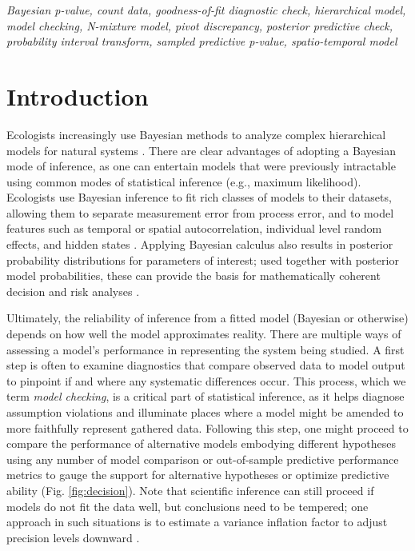 \documentclass[12pt,english]{article}
\begin{document}
\begin{spacing}{1.9}
{\em Bayesian p-value, count data, goodness-of-fit diagnostic check,
  hierarchical model, model checking, N-mixture model, pivot
  discrepancy, posterior predictive check, probability interval
  transform, sampled predictive p-value, spatio-temporal model}



\def\VAR{{\rm Var}\,} \def\COV{{\rm Cov}\,} \def\Prob{{\rm P}\,}
\def\bfx{{\bf x}} \def\bfX{{\bf X}} \def\bfY{{\bf Y}\,} \def\bfy{{\bf
    y}} \def\bfZ{{\bf Z}\,} \def\bftheta{\boldsymbol{\theta}}
\def\bfeta{\boldsymbol{\eta}} \def\bfOmega{\boldsymbol{\Omega}}
\def\bfbeta{\boldsymbol{\beta}} \def\bfSigma{\boldsymbol{\Sigma}}
\def\bfmu{\boldsymbol{\mu}} \def\bfnu{\boldsymbol{\nu}}
\def\bfepsilon{\boldsymbol{\epsilon}} \def\R2{\rm I\!R^2}


\section{Introduction}

Ecologists increasingly use Bayesian methods to analyze complex
hierarchical models for natural systems \citep{HobbsHooten2015}.
There are clear advantages of adopting a Bayesian mode of inference,
as one can entertain models that were previously intractable using
common modes of statistical inference (e.g., maximum
likelihood). Ecologists use Bayesian inference to fit rich classes of
models to their datasets, allowing them to separate measurement error
from process error, and to model features such as temporal or spatial
autocorrelation, individual level random effects, and hidden states
\citep{LinkEtAl2002,ClarkBjornstad2004,CressieEtAl2009}. Applying
Bayesian calculus also results in posterior probability distributions
for parameters of interest; used together with posterior model
probabilities, these can provide the basis for mathematically coherent
decision and risk analyses \citep{LinkBarker2006,Berger2013,
  williams2016combining}.

Ultimately, the reliability of inference from a fitted model (Bayesian
or otherwise) depends on how well the model approximates reality.
There are multiple ways of assessing a model's performance in
representing the system being studied. A first step is often to
examine diagnostics that compare observed data to model output to
pinpoint if and where any systematic differences occur. This process,
which we term \textit{model checking}, is a critical part of
statistical inference, as it helps diagnose assumption violations and
illuminate places where a model might be amended to more faithfully
represent gathered data. Following this step, one might proceed to
compare the performance of alternative models embodying different
hypotheses using any number of model comparison or out-of-sample
predictive performance metrics \citep[see][for a
review]{HootenHobbs2015} to gauge the support for alternative
hypotheses or optimize predictive ability (Fig. \ref{fig:decision}).
Note that scientific inference can still proceed if models do not fit
the data well, but conclusions need to be tempered; one approach in
such situations is to estimate a variance inflation factor to adjust
precision levels downward
\citep[e.g.,][]{CoxSnell1989,McCullaghNelder1989}.


\end{spacing}
\end{document}
